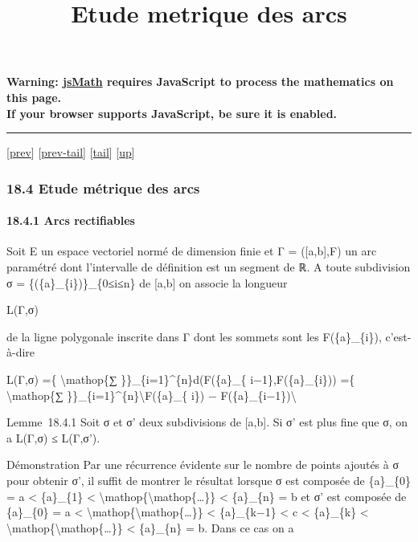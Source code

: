 \documentclass[]{article}
\title{Etude metrique des arcs}
\author{}
\date{}
\begin{document}
\maketitle

\textbf{Warning: \href{http://www.math.union.edu/locate/jsMath}{jsMath}
requires JavaScript to process the mathematics on this page.\\ If your
browser supports JavaScript, be sure it is enabled.}

\begin{center}\rule{3in}{0.4pt}\end{center}

{[}\href{coursse98.html}{prev}{]}
{[}\href{coursse98.html\#tailcoursse98.html}{prev-tail}{]}
{[}\hyperref[tailcoursse99.html]{tail}{]}
{[}\href{coursch19.html\#coursse99.html}{up}{]}

\subsubsection{18.4 Etude métrique des arcs}

\paragraph{18.4.1 Arcs rectifiables}

Soit E un espace vectoriel normé de dimension finie et Γ = ({[}a,b{]},F)
un arc paramétré dont l'intervalle de définition est un segment de ℝ. A
toute subdivision σ = \{(\{a\}\_\{i\})\}\_\{0≤i≤n\} de {[}a,b{]} on
associe la longueur

L(Γ,σ)

de la ligne polygonale inscrite dans Γ dont les sommets sont les
F(\{a\}\_\{i\}), c'est-à-dire

L(Γ,σ) =\{ \textbackslash{}mathop\{∑ \}\}\_\{i=1\}\^{}\{n\}d(F(\{a\}\_\{
i−1\},F(\{a\}\_\{i\})) =\{ \textbackslash{}mathop\{∑
\}\}\_\{i=1\}\^{}\{n\}\textbackslash{}\textbar{}F(\{a\}\_\{ i\}) −
F(\{a\}\_\{i−1\})\textbackslash{}\textbar{}

Lemme~18.4.1 Soit σ et σ' deux subdivisions de {[}a,b{]}. Si σ' est plus
fine que σ, on a L(Γ,σ) ≤ L(Γ,σ').

Démonstration Par une récurrence évidente sur le nombre de points
ajoutés à σ pour obtenir σ', il suffit de montrer le résultat lorsque σ
est composée de \{a\}\_\{0\} = a \textless{} \{a\}\_\{1\} \textless{}
\textbackslash{}mathop\{\textbackslash{}mathop\{\ldots{}\}\} \textless{}
\{a\}\_\{n\} = b et σ' est composée de \{a\}\_\{0\} = a \textless{}
\textbackslash{}mathop\{\textbackslash{}mathop\{\ldots{}\}\} \textless{}
\{a\}\_\{k−1\} \textless{} c \textless{} \{a\}\_\{k\} \textless{}
\textbackslash{}mathop\{\textbackslash{}mathop\{\ldots{}\}\} \textless{}
\{a\}\_\{n\} = b. Dans ce cas on a
\end{document}
